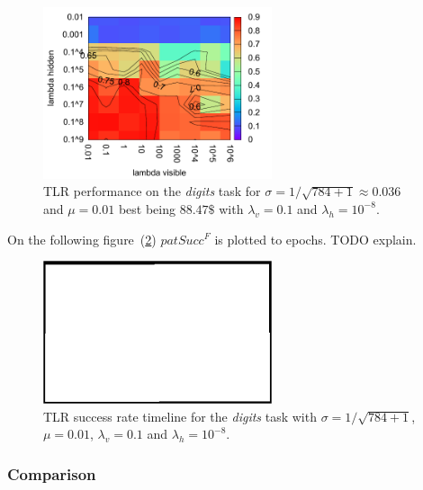 \begin{figure}[H]
  \centering
  \includegraphics[width=0.60\textwidth]{img/tlr-digits-psf.pdf} 
  \caption{TLR performance on the \emph{digits} task for $\sigma = 1/\sqrt{784+1} \approx 0.036$ and $\mu = 0.01$ best being $88.47\$$ with $\lambda_v=0.1$ and $\lambda_h=10^{-8}$.}
  \label{fig:results-tlr-digits-success}
\end{figure}

On the following figure~(\ref{fig:results-tlr-digits-epoch}) $patSucc^F$ is plotted to epochs. TODO explain. 

\begin{figure}[H]
  \centering
  \includegraphics[width=0.60\textwidth]{img/placeholder.png}  %
  \caption{TLR success rate timeline for the \emph{digits} task with $\sigma = 1/\sqrt{784+1}$, $\mu = 0.01$, $\lambda_v=0.1$ and $\lambda_h=10^{-8}$.}
  \label{fig:results-tlr-digits-epoch} 
\end{figure}

\subsubsection{Comparison} 
\label{sec:results-cmp-digits} 

